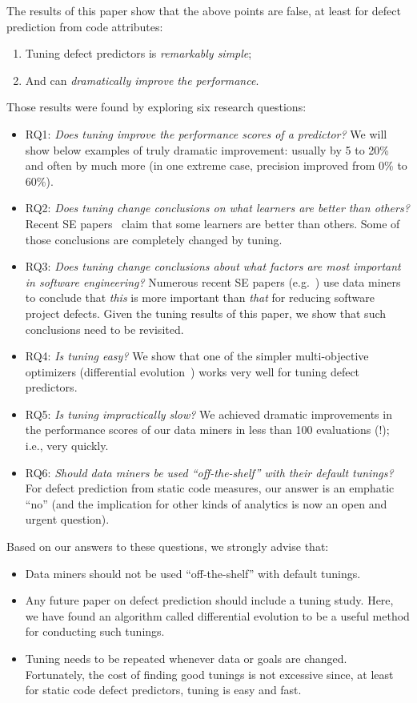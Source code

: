\documentclass[smallextended]{svjour3}
\newcommand{\bi}{\begin{itemize}[leftmargin=0.4cm]}
\newcommand{\ei}{\end{itemize}}
\newcommand{\be}{\begin{enumerate}}
\newcommand{\ee}{\end{enumerate}}
\begin{document}
The results of this paper show that the above points are
false,  at least for
defect prediction from  code attributes:
\be
\item
Tuning  defect predictors is {\em remarkably simple};
\item
And can {\em dramatically improve the performance}. 
\ee
Those results were found by   exploring six research questions:
\bi
\item RQ1: {\em Does   tuning    improve the performance scores of a predictor?} We will show below
 examples of truly dramatic improvement:
 usually by 5 to 20\% and often by much more (in one extreme case,  precision improved from 0\% to 60\%).
\item RQ2: {\em Does tuning change conclusions on what learners are better than others?} 
Recent SE papers~\cite{lessmann2008benchmarking,hall11} claim that some learners are better than others. 
Some of those conclusions are completely changed by tuning. 
\item RQ3: {\em Does tuning change conclusions about what factors are most important in software engineering?} Numerous recent SE papers (e.g.~\cite{bell2013limited,rahman2013how,me02k,Moser:2008,zimmermann2007predicting,%
herzig2013predicting}) use data miners to conclude that {\em this}
is more important than {\em that} for reducing software project defects.
Given the  tuning results of this paper, we show that such conclusions need to be revisited.
\item  RQ4: {\em Is tuning easy?} We show that one of the simpler multi-objective optimizers
(differential evolution~\cite{storn1997differential}) works very well for tuning defect predictors. 
\item RQ5: {\em Is tuning impractically slow?} We achieved dramatic improvements in the performance scores
of our data miners in less than 100 evaluations (!); i.e., very
quickly.
\item RQ6: {\em Should data miners be used ``off-the-shelf'' with their default tunings?} 
For defect prediction from static code measures, our answer is an emphatic ``no'' (and
the implication for other kinds of  analytics is now an open and urgent question).
\ei
Based on our answers to these  questions,  we strongly advise that:
\bi
\item
Data miners should not be used ``off-the-shelf'' with default tunings.
\item
Any future paper on defect prediction should include a 
tuning study. Here, we have found  an algorithm called differential
evolution to be a useful method for conducting such
tunings.
\item
Tuning needs to be repeated
whenever data or goals are changed.
Fortunately, the cost of finding good tunings is not excessive since, at least for
static code defect predictors, tuning is easy and fast.
\ei
\end{document}
